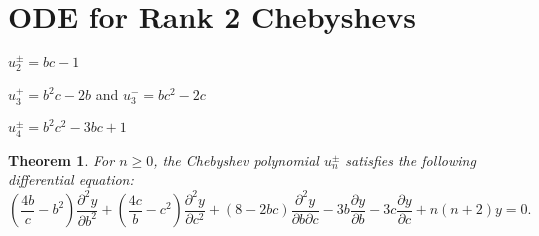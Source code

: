 \documentclass{amsart}
\newtheorem{theorem}{Theorem}
\numberwithin{theorem}{section}
\begin{document}
\section{ODE for Rank 2 Chebyshevs}

  $u_2^\pm = bc-1$

  $u_3^+=b^2c-2b$ and $u_3^-=bc^2-2c$

  $u_4^\pm = b^2c^2 - 3bc +1$

  \begin{theorem}
    For $n\ge0$, the Chebyshev polynomial $u_n^\pm$ satisfies the following differential equation:
    \[\left(\frac{4b}{c}-b^2\right)\frac{\partial^2 y}{\partial b^2} + \left(\frac{4c}{b}-c^2\right)\frac{\partial^2 y}{\partial c^2} + (8-2bc)\frac{\partial^2 y}{\partial b\partial c} - 3b\frac{\partial y}{\partial b} - 3c\frac{\partial y}{\partial c} + n(n+2) y = 0.\]
  \end{theorem}
\end{document}
